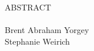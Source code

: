 \begin{doublespace}

\begin{centering}
{\Large ABSTRACT} \\
\Title \\
Brent Abraham Yorgey \\
Stephanie Weirich \\
\end{centering}

\vspace*{1in}


\end{doublespace}

